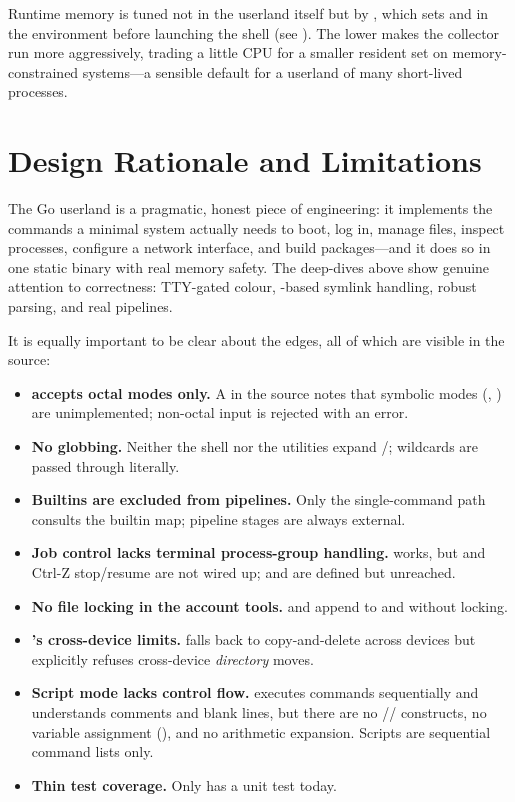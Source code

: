 Runtime memory is tuned not in the userland itself but by , which
sets  and  in the environment before
launching the shell (see ). The lower  makes the
collector run more aggressively, trading a little CPU for a smaller resident set
on memory-constrained systems---a sensible default for a userland of many
short-lived processes.

\section{Design Rationale and Limitations}

The Go userland is a pragmatic, honest piece of engineering: it implements the
commands a minimal system actually needs to boot, log in, manage files, inspect
processes, configure a network interface, and build packages---and it does so in
one static binary with real memory safety. The deep-dives above show genuine
attention to correctness: TTY-gated colour, -based symlink handling,
robust  parsing, and real pipelines.

It is equally important to be clear about the edges, all of which are visible in
the source:

\begin{itemize}
  \item \textbf{ accepts octal modes only.} A  in the
        source notes that symbolic modes (, ) are
        unimplemented; non-octal input is rejected with an error.
  \item \textbf{No globbing.} Neither the shell nor the utilities expand
        \code{*}/; wildcards are passed through literally.
  \item \textbf{Builtins are excluded from pipelines.} Only the single-command
        path consults the builtin map; pipeline stages are always external.
  \item \textbf{Job control lacks terminal process-group handling.} 
        works, but  and Ctrl-Z stop/resume are not wired up;
         and  are defined but unreached.
  \item \textbf{No file locking in the account tools.}  and
         append to  and 
        without locking.
  \item \textbf{'s cross-device limits.}  falls back to
        copy-and-delete across devices but explicitly refuses cross-device
        \emph{directory} moves.
  \item \textbf{Script mode lacks control flow.}  executes
        commands sequentially and understands comments and blank lines, but there
        are no // constructs, no variable
        assignment (), and no arithmetic expansion. Scripts are
        sequential command lists only.
  \item \textbf{Thin test coverage.} Only  has a unit test today.
\end{itemize}

